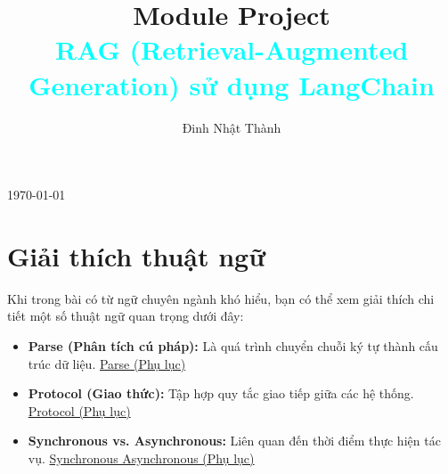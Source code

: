 \documentclass[11pt]{article}
\title{{Module Project}\\[0.5em]\textcolor{cyan}{RAG (Retrieval-Augmented Generation) sử dụng LangChain}}
\author{Đinh Nhật Thành}
\date{}
\renewcommand{\maketitle}{}
\begin{document}
\maketitle

\begin{titlepage}
    \centering
    \vspace*{\fill}

    {\Huge \textbf{\thetitle} \par}
    \vspace{2em}

    {\Large \textbf{\theauthor} \par}
    \vspace{1em}

    {\large \today \par}

    \vspace*{\fill}
    \thispagestyle{fancy}
\end{titlepage}

\newpage
\tableofcontents
\thispagestyle{fancy}

\setlength{\parindent}{2em} %


\newpage

\renewcommand{\thesubsection}{\arabic{subsection}}
\newpage

\section{Giải thích thuật ngữ}
Khi trong bài có từ ngữ chuyên ngành khó hiểu, bạn có thể xem giải thích chi tiết một số thuật ngữ quan trọng dưới đây:

\begin{itemize}
    \item \textbf{Parse (Phân tích cú pháp):}
    Là quá trình chuyển chuỗi ký tự thành cấu trúc dữ liệu. \hyperref[app:parse]{Parse (Phụ lục)}

    \item \textbf{Protocol (Giao thức):}
    Tập hợp quy tắc giao tiếp giữa các hệ thống. \hyperref[app:protocol]{Protocol (Phụ lục)}

    \item \textbf{Synchronous vs. Asynchronous:}
    Liên quan đến thời điểm thực hiện tác vụ. \hyperref[app:synchronous_asynchronous]{Synchronous Asynchronous (Phụ lục)}
\end{itemize}
\end{document}
